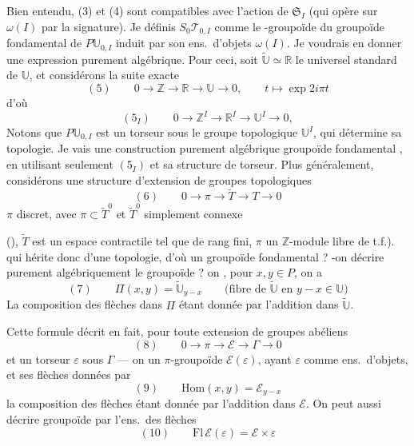 \documentclass[11pt,a4paper]{article}
\begin{document}


Bien entendu, (3) et (4) sont compatibles avec l'action de $\mathfrak{S}_I$ (qui opère sur $\omega(I)$ par la signature).
Je définis $S_0\mathcal{T}_{0,I}$ comme le -groupoïde du groupoïde fondamental de $P\mathbb{U}_{0,I}$ induit par son ens.\ d'objets $\omega(I)$. Je voudrais en donner une expression purement algébrique. Pour ceci, soit $\tilde{\mathbb{U}} \simeq \mathbb{R}$ le  universel standard de $\mathbb{U}$, et considérons la suite exacte
\[
  (5) \qquad 0 \to \mathbb{Z} \to \mathbb{R} \to \mathbb{U} \to 0 ,
  \qquad t \mapsto \exp 2i\pi t
\]
d'où
\[
  (5_I) \qquad 0 \to \mathbb{Z}^I \to \mathbb{R}^I \to \mathbb{U}^I \to 0 ,
\]
Notons que $P\mathbb{U}_{0,I}$ est un torseur sous le groupe topologique $\mathbb{U}^I$, \struck{\ill{}}  qui détermine sa topologie. Je vais \ill{} une construction purement algébrique  groupoïde fondamental \ill{} \ill{}, en utilisant seulement $(5_I)$ et sa structure de torseur. Plus généralement, considérons une structure d'extension de groupes topologiques
\[
  (6) \qquad 0 \to \pi \to \tilde T \to T \to 0
\]
$\pi$ discret, avec $\pi \subset \tilde T^0$ et $\tilde T^0$ simplement connexe

(), $\tilde T$ est un espace contractile tel que \ill{} de rang fini, $\pi$ un $\mathbb{Z}$-module libre de t.f.).
  qui hérite donc d'une topologie, d'où \ill{} un groupoïde fondamental ? -on décrire purement algébriquement le groupoïde \ill{} ? \ill{} on \ill{}, pour $x, y \in P$, on a \ill{}
\[
  (7) \qquad \Pi(x,y) = \tilde{\mathbb{U}}_{y-x}
  \qquad \text{(fibre de $\tilde{\mathbb{U}}$ en $y - x \in \mathbb{U}$)}
\]
La composition des flèches dans $\Pi$ \ill{} étant donnée par l'addition dans $\tilde{\mathbb{U}}$.

\struck{\ill{}} Cette formule décrit  en fait, pour toute extension de groupes abéliens
\[
  (8) \qquad 0 \to \pi \to \mathcal{E} \to \Gamma \to 0
\]
et un torseur $\varepsilon$ sous $\Gamma$ --- on  un $\pi$-groupoïde $\mathcal{E}(\varepsilon)$, ayant $\varepsilon$ comme ens.\ d'objets, et ses flèches données par
\[
  (9) \qquad \mathrm{Hom}(x,y) = \mathcal{E}_{y-x}
\]
la composition des flèches étant donnée par l'addition dans $\mathcal{E}$. On peut aussi décrire  groupoïde par l'ens.\ des flèches
\[
  (10) \qquad \mathrm{Fl}\,\mathcal{E}(\varepsilon) = \mathcal{E} \times \varepsilon
\]
\end{document}
